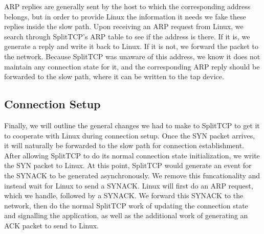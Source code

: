 ARP replies are generally sent by the host to which the corresponding address
belongs, but in order to provide Linux the information it needs we fake these 
replies inside the slow path. Upon receiving an ARP request from Linux, we 
search through SplitTCP's ARP table to see if the address is there. If it is, 
we generate a reply and write it back to Linux. If it is not, we forward the 
packet to the network. Because SplitTCP was unaware of this address, we know
it does not maintain any connection state for it, and the corresponding ARP 
reply should be forwarded to the slow path, where it can be written to the tap
device. 

\subsection{Connection Setup}

Finally, we will outline the general changes we had to make to SplitTCP to get
it to cooperate with Linux during connection setup. Once the SYN packet arrives,
 it will naturally be forwarded to the slow path for
connection establishment. After allowing SplitTCP to do its normal connection 
state initialization, we write the SYN packet to Linux. At this point, SplitTCP
would generate an event for the SYNACK to be generated asynchronously. We remove
this funcationality and instead wait for Linux to send a SYNACK. Linux will 
first do an ARP request, which we handle, followed by a SYNACK. We forward this
SYNACK to the network, then do the normal SplitTCP work of updating the 
connection state and signalling the application, as well as the additional work 
of generating an ACK packet to send to Linux. 

